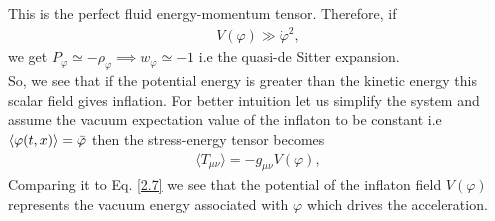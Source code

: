 This is the perfect fluid energy-momentum tensor. Therefore, if 
\begin{align}
    V(\varphi) \gg \dot{\varphi}^2 ,\ \label{2.27}
\end{align}
we get $P_{\varphi} \simeq -\rho_{\varphi} \implies w_{\varphi} \simeq -1 $ i.e the quasi-de Sitter expansion.\\
So, we see that if the potential energy is greater than the kinetic energy  this scalar field gives inflation. For better intuition let us simplify the system and assume the vacuum expectation value of the inflaton to be constant i.e \(\langle \varphi(t,x) \rangle = \Bar{\varphi}\) then the stress-energy tensor becomes
\begin{align}
    \langle T_{\mu\nu} \rangle  = -g_{\mu\nu} V(\varphi) ,\ \label{2.28}
\end{align}
Comparing it to Eq. \ref{2.7} we see that the potential of the inflaton field $V(\varphi)$  represents the vacuum energy associated with $\varphi$ which drives the acceleration.\\

